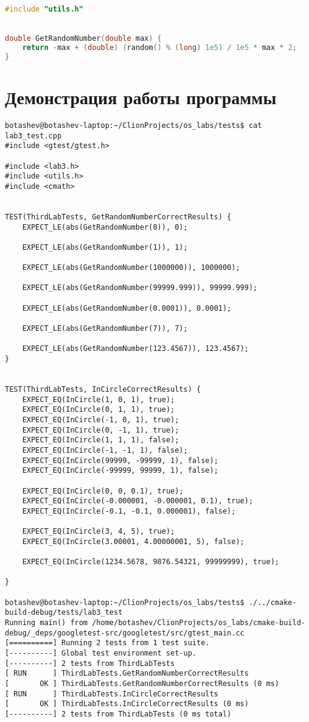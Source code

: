 \documentclass[pdf, unicode, 12pt, a4paper,oneside,fleqn]{article}
\begin{document}
\begin{lstlisting}[language=C++]
#include "utils.h"


double GetRandomNumber(double max) {
    return -max + (double) (random() % (long) 1e5) / 1e5 * max * 2;
}
\end{lstlisting}

\section{Демонстрация работы программы}

\begin{verbatim}
botashev@botashev-laptop:~/ClionProjects/os_labs/tests$ cat lab3_test.cpp 
#include <gtest/gtest.h>

#include <lab3.h>
#include <utils.h>
#include <cmath>


TEST(ThirdLabTests, GetRandomNumberCorrectResults) {
    EXPECT_LE(abs(GetRandomNumber(0)), 0);

    EXPECT_LE(abs(GetRandomNumber(1)), 1);

    EXPECT_LE(abs(GetRandomNumber(1000000)), 1000000);

    EXPECT_LE(abs(GetRandomNumber(99999.999)), 99999.999);

    EXPECT_LE(abs(GetRandomNumber(0.0001)), 0.0001);

    EXPECT_LE(abs(GetRandomNumber(7)), 7);

    EXPECT_LE(abs(GetRandomNumber(123.4567)), 123.4567);
}


TEST(ThirdLabTests, InCircleCorrectResults) {
    EXPECT_EQ(InCircle(1, 0, 1), true);
    EXPECT_EQ(InCircle(0, 1, 1), true);
    EXPECT_EQ(InCircle(-1, 0, 1), true);
    EXPECT_EQ(InCircle(0, -1, 1), true);
    EXPECT_EQ(InCircle(1, 1, 1), false);
    EXPECT_EQ(InCircle(-1, -1, 1), false);
    EXPECT_EQ(InCircle(99999, -99999, 1), false);
    EXPECT_EQ(InCircle(-99999, 99999, 1), false);

    EXPECT_EQ(InCircle(0, 0, 0.1), true);
    EXPECT_EQ(InCircle(-0.000001, -0.000001, 0.1), true);
    EXPECT_EQ(InCircle(-0.1, -0.1, 0.000001), false);

    EXPECT_EQ(InCircle(3, 4, 5), true);
    EXPECT_EQ(InCircle(3.00001, 4.00000001, 5), false);

    EXPECT_EQ(InCircle(1234.5678, 9876.54321, 99999999), true);

}

botashev@botashev-laptop:~/ClionProjects/os_labs/tests$ ./../cmake-build-debug/tests/lab3_test 
Running main() from /home/botashev/ClionProjects/os_labs/cmake-build-debug/_deps/googletest-src/googletest/src/gtest_main.cc
[==========] Running 2 tests from 1 test suite.
[----------] Global test environment set-up.
[----------] 2 tests from ThirdLabTests
[ RUN      ] ThirdLabTests.GetRandomNumberCorrectResults
[       OK ] ThirdLabTests.GetRandomNumberCorrectResults (0 ms)
[ RUN      ] ThirdLabTests.InCircleCorrectResults
[       OK ] ThirdLabTests.InCircleCorrectResults (0 ms)
[----------] 2 tests from ThirdLabTests (0 ms total)


\end{verbatim}
\end{document}
